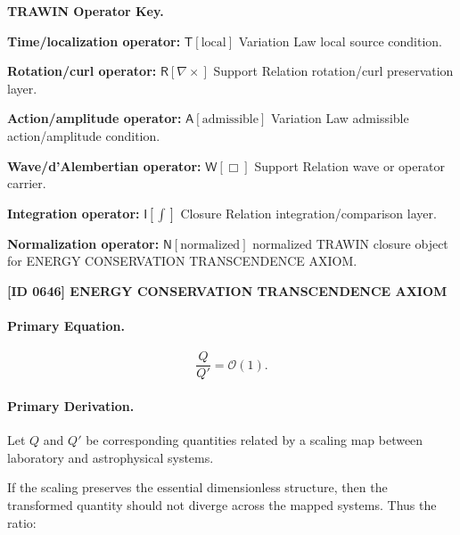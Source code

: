 \par\vspace{0.45\baselineskip}
\noindent\begin{minipage}[t]{\linewidth}
\begingroup
\small
\raggedright
\textbf{TRAWIN Operator Key.}\par
\noindent\textbf{Time/localization operator:} $\mathsf{T}\!\left[\mathrm{local}\right]$ Variation Law local source condition.\par
\noindent\textbf{Rotation/curl operator:} $\mathsf{R}\!\left[\nabla\times\right]$ Support Relation rotation/curl preservation layer.\par
\noindent\textbf{Action/amplitude operator:} $\mathsf{A}\!\left[\mathrm{admissible}\right]$ Variation Law admissible action/amplitude condition.\par
\noindent\textbf{Wave/d'Alembertian operator:} $\mathsf{W}\!\left[\Box\right]$ Support Relation wave or operator carrier.\par
\noindent\textbf{Integration operator:} $\mathsf{I}\!\left[\int\right]$ Closure Relation integration/comparison layer.\par
\noindent\textbf{Normalization operator:} $\mathsf{N}\!\left[\mathrm{normalized}\right]$ normalized TRAWIN closure object for ENERGY CONSERVATION TRANSCENDENCE AXIOM.\par
\endgroup
\end{minipage}

\clearpage
\noindent\textbf{[ID 0646] ENERGY CONSERVATION TRANSCENDENCE AXIOM}\par
\vspace{0.35em}
\paragraph{Primary Equation.}
\begin{equation}
\frac{Q}{Q'}
=
\mathcal{O}(1).
\end{equation}

\paragraph{Primary Derivation.}
Let $Q$ and $Q'$ be corresponding quantities related by a scaling map between laboratory and astrophysical systems.

If the scaling preserves the essential dimensionless structure, then the transformed quantity should not diverge across the mapped systems. Thus the ratio:

